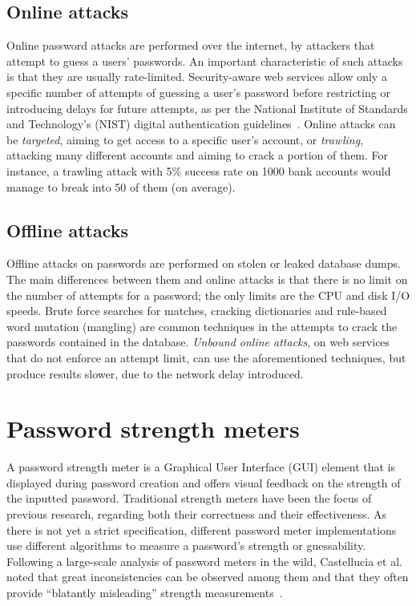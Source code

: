     \subsection{Online attacks}
      \label{ssec:online_attacks}
      Online password attacks are performed over the internet, by attackers that attempt to guess a users' passwords. An important characteristic of such attacks is that they are usually rate-limited. Security-aware web services allow only a specific number of attempts of guessing a user's password before restricting or introducing delays for future attempts, as per the National Institute of Standards and Technology's (NIST) digital authentication guidelines~\cite{NIST}. Online attacks can be \emph{targeted}, aiming to get access to a specific user's account, or \emph{trawling}, attacking many different accounts and aiming to crack a portion of them. For instance, a trawling attack with 5\% success rate on 1000 bank accounts would manage to break into 50 of them (on average).

    \subsection{Offline attacks}
      \label{ssec:offline_attacks}
      Offline attacks on passwords are performed on stolen or leaked database dumps. The main differences between them and online attacks is that there is no limit on the number of attempts for a password; the only limits are the CPU and disk I/O speeds. Brute force searches for matches, cracking dictionaries and rule-based word mutation (mangling) are common techniques in the attempts to crack the passwords contained in the database. \emph{Unbound online attacks}, on web services that do not enforce an attempt limit, can use the aforementioned techniques, but produce results slower, due to the network delay introduced.


  \section{Password strength meters}
    \label{sec:pass_str_meters}
    A password strength meter is a Graphical User Interface (GUI) element that is displayed during password creation and offers visual feedback on the strength of the inputted password. Traditional strength meters have been the focus of previous research, regarding both their correctness and their effectiveness. As there is not yet a strict specification, different password meter implementations use different algorithms to measure a password's strength or guessability. Following a large-scale analysis of password meters in the wild, Castellucia et al. noted that great inconsistencies can be observed among them and that they often provide ``blatantly misleading'' strength measurements~\cite{pass_str_meter_analysis}.

